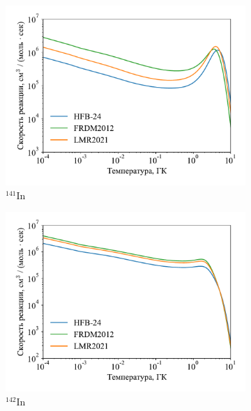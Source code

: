 \begin{figure}
  \centering
  \begin{subfigure}{0.48\textwidth}
    \centering
    \includegraphics[width=\textwidth]{pics/rate_in141.pdf}
    \caption{${}^{141}$In}
    \label{fig:ng_rate:141in}
  \end{subfigure}
  \hfill
  \begin{subfigure}{0.48\textwidth}
    \centering
    \includegraphics[width=\textwidth]{pics/rate_in142.pdf}
    \caption{${}^{142}$In}
  \end{subfigure}
  \\
  \begin{subfigure}{0.48\textwidth}
    \centering

\end{subfigure}
\end{figure}

